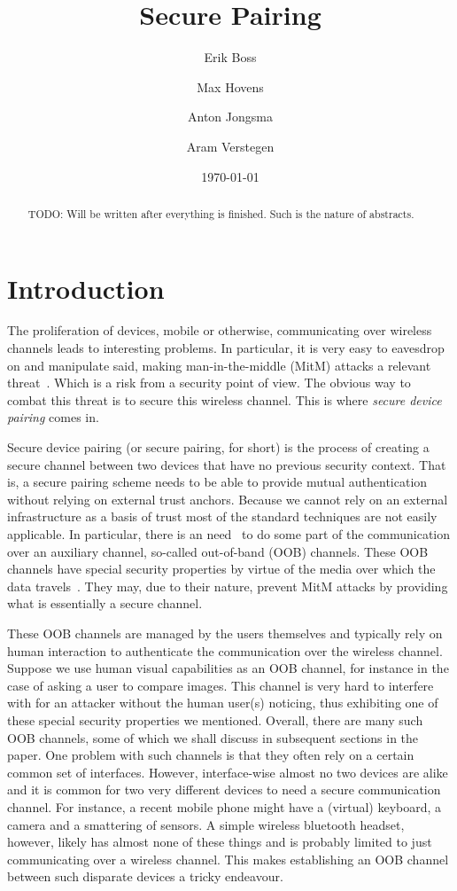 \documentclass[conference, 12pt]{sty/IEEEtran}
\title{Secure Pairing}
\author{Erik Boss \and Max Hovens \and Anton Jongsma \and Aram Verstegen}
\date{\today}
\begin{document}
\maketitle

\begin{abstract}
    TODO: Will be written after everything is finished. Such is the nature of abstracts.
\end{abstract}

\section{Introduction}
\label{sec:introduction}

The proliferation of devices, mobile or otherwise, communicating over wireless channels leads to interesting problems.
In particular, it is very easy to eavesdrop on and manipulate said, making man-in-the-middle (MitM) attacks a relevant threat~\cite{kumar2009comparative}.
Which is a risk from a security point of view.
The obvious way to combat this threat is to secure this wireless channel.
This is where \emph{secure device pairing} comes in.

Secure device pairing (or secure pairing, for short) is the process of creating a secure channel between two devices that have no previous security context.
That is, a secure pairing scheme needs to be able to provide mutual authentication without relying on external trust anchors.
Because we cannot rely on an external infrastructure as a basis of trust most of the standard techniques are not easily applicable.
In particular, there is an need~\cite{kumar2009comparative} to do some part of the communication over an auxiliary channel, so-called out-of-band (OOB) channels.
These OOB channels have special security properties by virtue of the media over which the data travels~\cite{balfanz2002talking}.
They may, due to their nature, prevent MitM attacks by providing what is essentially a secure channel.

These OOB channels are managed by the users themselves and typically rely on human interaction to authenticate the communication over the wireless channel.
Suppose we use human visual capabilities as an OOB channel, for instance in the case of asking a user to compare images.
This channel is very hard to interfere with for an attacker without the human user(s) noticing, thus exhibiting one of these special security properties we mentioned.
Overall, there are many such OOB channels, some of which we shall discuss in subsequent sections in the paper.
One problem with such channels is that they often rely on a certain common set of interfaces.
However, interface-wise almost no two devices are alike and it is common for two very different devices to need a secure communication channel.
For instance, a recent mobile phone might have a (virtual) keyboard, a camera and a smattering of sensors.
A simple wireless bluetooth headset, however, likely has almost none of these things and is probably limited to just communicating over a wireless channel.
This makes establishing an OOB channel between such disparate devices a tricky endeavour.
\end{document}
